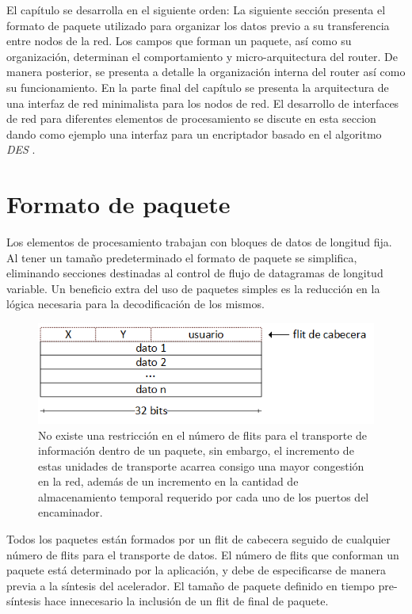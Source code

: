El capítulo se desarrolla en el siguiente orden: La siguiente sección presenta el formato de paquete utilizado para organizar los datos previo a su transferencia entre nodos de la red. Los campos que forman un paquete, así como su organización, determinan el comportamiento y micro-arquitectura del router. De manera posterior, se presenta a detalle la organización interna del router así como su funcionamiento. En la parte final del capítulo se presenta la arquitectura de una interfaz de red minimalista para los nodos de red. El desarrollo de interfaces de red para diferentes elementos de procesamiento se discute en esta seccion dando como ejemplo una interfaz para un encriptador basado en el algoritmo \textit{DES} \cite{chapter0:NIST:1977:DES}.


\section{Formato de paquete}
	\label{sec:formato_paquete}

Los elementos de procesamiento trabajan con bloques de datos de longitud fija. Al tener un tamaño predeterminado el formato de paquete se simplifica, eliminando secciones destinadas al control de flujo de datagramas de longitud variable. Un beneficio extra del uso de paquetes simples es la reducción en la lógica necesaria para la decodificación de los mismos.


\begin{figure}
	\begin{center}
		\includegraphics[scale=0.7]{figures/ch4_organizacion_paquete.png}
	\end{center}
	\caption
		{	
			No existe una restricción en el número de flits para el transporte de información dentro de un paquete, sin embargo, el incremento de estas unidades de transporte acarrea consigo una mayor congestión en la red, además de un incremento en la cantidad de almacenamiento temporal requerido por cada uno de los puertos del encaminador.
		}
	\label{fig:ch4_organizacion_paquete}
\end{figure}


 Todos los paquetes están formados por un flit de cabecera seguido de cualquier número de flits para el transporte de datos. El número de flits que conforman un paquete está determinado por la aplicación, y debe de especificarse de manera previa a la síntesis del acelerador. El tamaño de paquete definido en tiempo pre-síntesis hace innecesario la inclusión de un flit de final de paquete.

